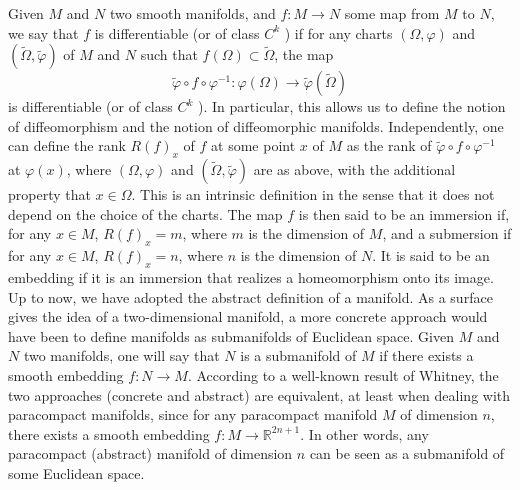 \documentclass[12pt,hyperref,a4paper,UTF8]{ctexart}
\begin{document}
Given $M$ and $N$ two smooth manifolds, and $f: M \rightarrow N$ some map from $M$ to $N$, we say that $f$ is differentiable (or of class $C^k$ ) if for any charts $(\Omega, \varphi)$ and $(\tilde{\Omega}, \tilde{\varphi})$ of $M$ and $N$ such that $f(\Omega) \subset \tilde{\Omega}$, the map
$$
\tilde{\varphi} \circ f \circ \varphi^{-1}: \varphi(\Omega) \rightarrow \tilde{\varphi}(\tilde{\Omega})
$$
is differentiable (or of class $C^k$ ). In particular, this allows us to define the notion of diffeomorphism and the notion of diffeomorphic manifolds. Independently, one can define the rank $R(f)_x$ of $f$ at some point $x$ of $M$ as the rank of $\tilde{\varphi} \circ f \circ \varphi^{-1}$ at $\varphi(x)$, where $(\Omega, \varphi)$ and $(\tilde{\Omega}, \tilde{\varphi})$ are as above, with the additional property that $x \in \Omega$. This is an intrinsic definition in the sense that it does not depend on the choice of the charts. The map $f$ is then said to be an immersion if, for any $x \in M$, $R(f)_x=m$, where $m$ is the dimension of $M$, and a submersion if for any $x \in M$, $R(f)_x=n$, where $n$ is the dimension of $N$. It is said to be an embedding if it is an immersion that realizes a homeomorphism onto its image.
\vskip 3pt
Up to now, we have adopted the abstract definition of a manifold. As a surface gives the idea of a two-dimensional manifold, a more concrete approach would have been to define manifolds as submanifolds of Euclidean space. Given $M$ and $N$ two manifolds, one will say that $N$ is a submanifold of $M$ if there exists a smooth embedding $f: N \rightarrow M$. According to a well-known result of Whitney, the two approaches (concrete and abstract) are equivalent, at least when dealing with paracompact manifolds, since for any paracompact manifold $M$ of dimension $n$, there exists a smooth embedding $f: M \rightarrow \mathbb{R}^{2 n+1}$. In other words, any paracompact (abstract) manifold of dimension $n$ can be seen as a submanifold of some Euclidean space.
\end{document}
